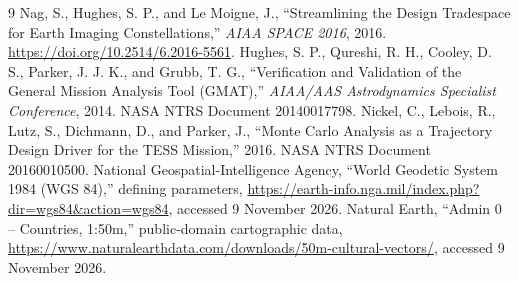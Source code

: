 \documentclass[conf]{new-aiaa}
\begin{document}
\FloatBarrier
\begin{thebibliography}{9}
Nag, S., Hughes, S. P., and Le Moigne, J.,
``Streamlining the Design Tradespace for Earth Imaging Constellations,''
\textit{AIAA SPACE 2016}, 2016.
\url{https://doi.org/10.2514/6.2016-5561}.
Hughes, S. P., Qureshi, R. H., Cooley, D. S., Parker, J. J. K., and Grubb, T. G.,
``Verification and Validation of the General Mission Analysis Tool (GMAT),''
\textit{AIAA/AAS Astrodynamics Specialist Conference}, 2014.
NASA NTRS Document 20140017798.
Nickel, C., Lebois, R., Lutz, S., Dichmann, D., and Parker, J.,
``Monte Carlo Analysis as a Trajectory Design Driver for the TESS Mission,''
2016. NASA NTRS Document 20160010500.
National Geospatial-Intelligence Agency,
``World Geodetic System 1984 (WGS 84),'' defining parameters,
\url{https://earth-info.nga.mil/index.php?dir=wgs84&action=wgs84},
accessed 9 November 2026.
Natural Earth, ``Admin 0 -- Countries, 1:50m,'' public-domain cartographic data,
\url{https://www.naturalearthdata.com/downloads/50m-cultural-vectors/},
accessed 9 November 2026.
\end{thebibliography}
\end{document}
